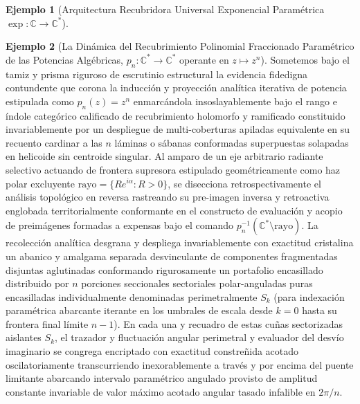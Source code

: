 \documentclass[11pt,a4paper]{article}
\theoremstyle{definition}
\newtheorem{ejemplo}{Ejemplo}[section]
\theoremstyle{remark}
\numberwithin{equation}{section}
\begin{document}
\begin{ejemplo}[Arquitectura Recubridora Universal Exponencial Paramétrica $\exp: \mathbb{C} \to \mathbb{C}^*$]
\begin{center}
\end{center}
\end{ejemplo}

\begin{ejemplo}[La Dinámica del Recubrimiento Polinomial Fraccionado Paramétrico de las Potencias Algébricas, $p_n: \mathbb{C}^* \to \mathbb{C}^*$ operante en $z \mapsto z^n$]
Sometemos bajo el tamiz y prisma riguroso de escrutinio estructural la evidencia fidedigna contundente que corona la inducción y proyección analítica iterativa de potencia estipulada como $p_n(z) = z^n$ enmarcándola insoslayablemente bajo el rango e índole categórico calificado de recubrimiento holomorfo y ramificado constituido invariablemente por un despliegue de multi-coberturas apiladas equivalente en su recuento cardinar a las $n$ láminas o sábanas conformadas superpuestas solapadas en helicoide sin centroide singular.
Al amparo de un eje arbitrario radiante selectivo actuando de frontera supresora estipulado geométricamente como haz polar excluyente $\text{rayo} = \{ R e^{i\alpha} : R > 0 \}$, se disecciona retrospectivamente el análisis topológico en reversa rastreando su pre-imagen inversa y retroactiva englobada territorialmente conformante en el constructo de evaluación y acopio de preimágenes formadas a expensas bajo el comando $p_n^{-1}(\mathbb{C}^* \setminus \text{rayo})$. La recolección analítica desgrana y despliega invariablemente con exactitud cristalina un abanico y amalgama separada desvinculante de componentes fragmentadas disjuntas aglutinadas conformando rigurosamente un portafolio encasillado distribuido por $n$ porciones seccionales sectoriales polar-anguladas puras encasilladas individualmente denominadas perimetralmente $S_k$ (para indexación paramétrica abarcante iterante en los umbrales de escala desde $k=0$ hasta su frontera final límite $n-1$). En cada una y recuadro de estas cuñas sectorizadas aislantes $S_k$, el trazador y fluctuación angular perimetral y evaluador del desvío imaginario se congrega encriptado con exactitud constreñida acotado oscilatoriamente transcurriendo inexorablemente a través y por encima del puente limitante abarcando intervalo paramétrico angulado provisto de amplitud constante invariable de valor máximo acotado angular tasado infalible en $2\pi/n$.


\end{ejemplo}
\end{document}
